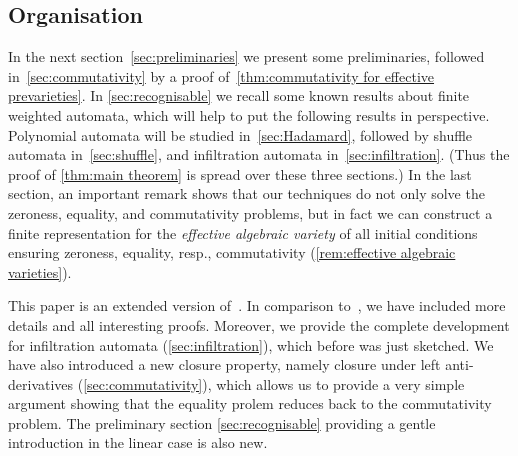 \subsection*{Organisation}
%
In the next section~\cref{sec:preliminaries} we present some preliminaries,
followed in~\cref{sec:commutativity} by a proof of~\cref{thm:commutativity for effective prevarieties}.
%
In \cref{sec:recognisable} we recall some known results about finite weighted automata,
which will help to put the following results in perspective.
%
Polynomial automata will be studied in~\cref{sec:Hadamard},
followed by shuffle automata in~\cref{sec:shuffle},
and infiltration automata in~\cref{sec:infiltration}.
%
(Thus the proof of \cref{thm:main theorem} is spread over these three sections.)
%
In the last section, an important remark shows that our techniques do not only solve the zeroness, equality, and commutativity problems,
but in fact we can construct a finite representation for the \emph{effective algebraic variety}
of all initial conditions ensuring zeroness, equality, resp., commutativity (\cref{rem:effective algebraic varieties}).
%

This paper is an extended version of~\cite{Clemente:LICS:2025}.
%
In comparison to~\cite{Clemente:LICS:2025},
we have included more details and all interesting proofs.
%
Moreover, we provide the complete development for infiltration automata (\cref{sec:infiltration}),
which before was just sketched.
%
We have also introduced a new closure property,
namely closure under left anti-derivatives (\cref{sec:commutativity}),
which allows us to provide a very simple argument showing that the equality prolem
reduces back to the commutativity problem.
%
The preliminary section \cref{sec:recognisable} providing a gentle introduction in the linear case is also new.